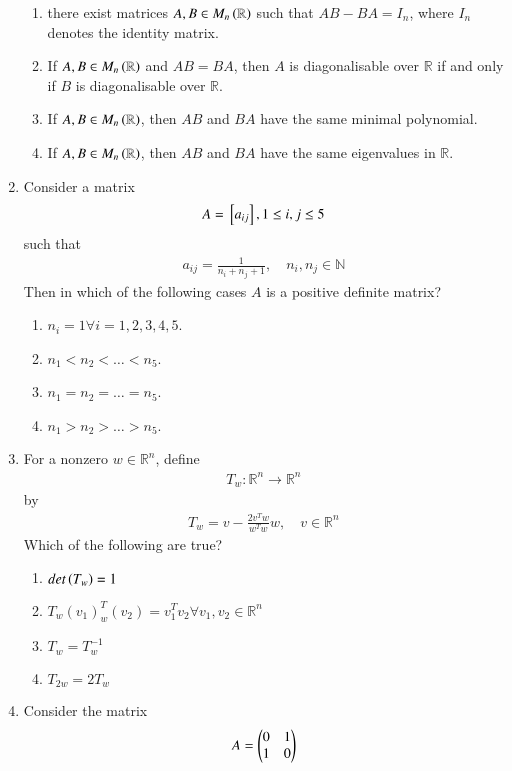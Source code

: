 \begin{enumerate}[label=\thesection.\arabic*.,ref=\thesection.\theenumi]
\begin{enumerate}
\item there exist matrices $A,B \in M_n\left(\mathbb{R}\right)$ such that $AB- BA = I_n$, where $I_n$ denotes the identity matrix.
\item If $A,B \in M_n\left(\mathbb{R}\right)$ and $AB = BA$, then $A$ is diagonalisable over $\mathbb{R}$ if and only if $B$ is diagonalisable over $\mathbb{R}$.
\item If $A,B \in M_n\left(\mathbb{R}\right)$, then $AB$ and $BA$ have the same minimal polynomial.
\item If $A,B \in M_n\left(\mathbb{R}\right)$, then $AB$ and $BA$ have the same eigenvalues in $\mathbb{R}$.
\end{enumerate}
\item Consider a matrix 
\begin{align}
A = {}\left[a_{ij}\right], 1 \le i,j \le 5
\end{align}
such that
\begin{align}
a_{ij} = \frac{1}{n_i+n_j+1}, \quad n_i,n_j \in \mathbb{N}
\end{align}
Then in which of the following cases $A$ is a positive definite matrix?
\begin{enumerate}
\item $n_i = 1 \forall i = 1,2,3,4,5$.
\item $n_1 < n_2 < \dots < n_5$.
\item $n_1 = n_2 = \dots = n_5$.
\item $n_1 > n_2 > \dots > n_5$.
\end{enumerate}
\item For a nonzero $w \in \mathbb{R}^n$, define
\begin{align}
T_w: \mathbb{R}^n \to \mathbb{R}^n
\end{align}
by
\begin{align}
T_w = v - \frac{2v^Tw}{w^Tw}w, \quad v \in \mathbb{R}^n
\end{align}
Which of the following are true?
\begin{enumerate}
\item $det\left(T_w\right) = 1$
\item $T_w(v_1)^T_w(v_2) = v_1^Tv_2 \forall v_1, v_2 \in \mathbb{R}^n$
\item  $T_w = T_w ^{-1}$
\item  $T_{2w} = 2T_{w}$
\end{enumerate}
\item Consider the matrix 
\begin{align}
A = \myvec{0 & 1 \\ 1 & 0}

\end{align}
\end{enumerate}
